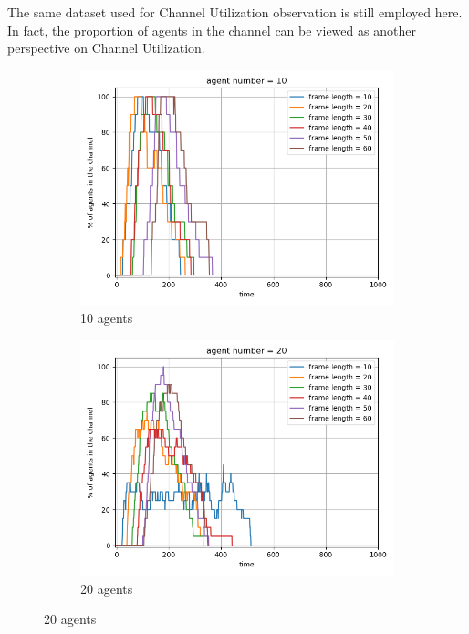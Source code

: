 The same dataset used for Channel Utilization observation is still employed here. In fact, the proportion of agents in the channel can be viewed as another perspective on Channel Utilization.

\begin{figure}[htbp]
    \centering
    \begin{subfigure}[t]{0.45\linewidth}
        \centering
        \includegraphics[width=\linewidth]{figures/channel_usage_agent10.png}
        \caption{10 agents}
        \label{fig:agentpercent1}
    \end{subfigure}
    \hfill
    \begin{subfigure}[t]{0.45\linewidth}
        \centering
        \includegraphics[width=\linewidth]{figures/channel_usage_agent20.png}
        \caption{20 agents}
        \label{fig:agentpercent2}
    \end{subfigure}
    

\end{figure}
